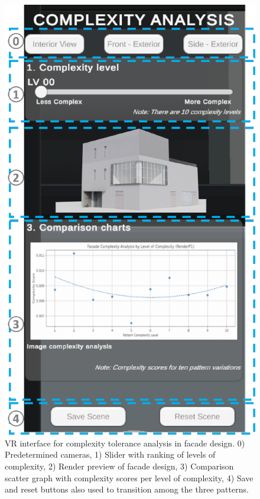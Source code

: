      \begin{figure}[htb]
          \centering
          \includegraphics[width= \linewidth]{Images/VRInterface}
          \caption{VR interface for complexity tolerance analysis in facade design. 0) Predetermined cameras, 1) Slider with ranking of levels of complexity, 2) Render preview of facade design, 3) Comparison scatter graph with complexity scores per level of complexity, 4) Save and reset buttons also used to transition among the three patterns.}
          \label{fig:VRInterface}
        \end{figure}